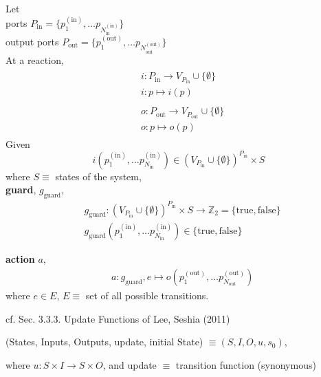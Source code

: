 \documentclass[10pt]{amsart}
\begin{document}
\begin{multicols*}{2}
Let \\
ports $P_{\text{in}} = \lbrace p_1^{(\text{in})}, \dots p_{N_{\text{in}}^{(\text{in})}} \rbrace$ \\
output ports $P_{\text{out}} = \lbrace p_1^{(\text{out})}, \dots p_{N_{\text{out}}^{(\text{out})}} \rbrace$ \\

At a reaction, 
\begin{equation}
\begin{gathered}
\begin{aligned}
& i: P_{\text{in}} \to V_{P_{\text{in}}} \cup \lbrace \emptyset \rbrace \\
& i: p \mapsto i(p) 
\end{aligned} \\
\begin{aligned}
& o: P_{\text{out}} \to V_{P_{\text{out}}} \cup \lbrace \emptyset \rbrace \\ 
& o: p \mapsto o(p)	
\end{aligned}
\end{gathered}
\end{equation}
Given 
\[
i(p_1^{(\text{in})}, \dots p_{N_{\text{in}}}^{(\text{in}) } )  \in ( V_{P_{\text{in}}} \cup \lbrace \emptyset \rbrace )^{P_{\text{in}} } \times S
\]
where $S \equiv $ states of the system,  \\

\textbf{guard}, $g_{\text{guard}}$, 
\begin{equation}
\begin{aligned}
& g_{\text{guard}} : ( V_{P_{\text{in}}} \cup \lbrace \emptyset \rbrace )^{P_{\text{in}} } \times S \to \mathbb{Z}_2 = \lbrace \text{true}, \text{false} \rbrace \\ 
& g_{\text{guard}}( p_1^{(\text{in})}, \dots p_{N_{\text{in}}}^{(\text{in})} ) \in \lbrace \text{true}, \text{false} \rbrace 
\end{aligned}
\end{equation}

\textbf{action}  $a$, 
\begin{equation}
\begin{aligned}
& a : g_{\text{guard}}, e \mapsto o( p_1^{(\text{out})}, \dots p_{N_{\text{out}}}^{(\text{out})} )
\end{aligned}
\end{equation}
where  $e\in E$, $E \equiv $ set of all possible transitions.  

cf. Sec. 3.3.3. Update Functions of Lee, Seshia (2011)  

(States, Inputs, Outputs, update, initial State) $\equiv  (S,I, O, u,s_0)$,  

where $u: S\times I \to S \times O$, and update $\equiv $ transition function (synonymous)







\end{multicols*}
\end{document}
